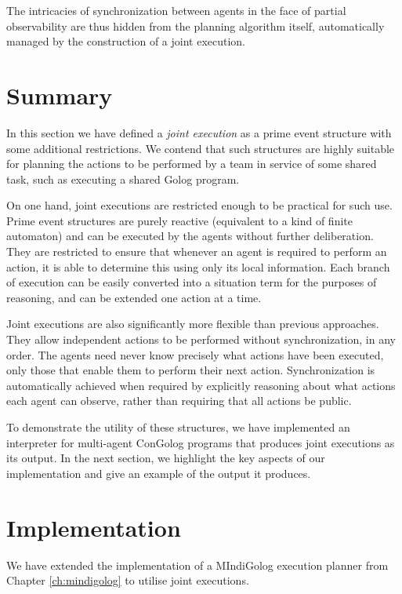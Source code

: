 The intricacies of synchronization between agents in the face of partial
observability are thus hidden from the planning algorithm itself,
automatically managed by the construction of a joint execution.


\section{Summary\label{sec:JointExec:Summary}}

In this section we have defined a \emph{joint execution} as a prime
event structure with some additional restrictions. We contend that
such structures are highly suitable for planning the actions to be
performed by a team in service of some shared task, such as executing
a shared Golog program.

On one hand, joint executions are restricted enough to be practical
for such use. Prime event structures are purely reactive (equivalent
to a kind of finite automaton) and can be executed by the agents without
further deliberation. They are restricted to ensure that whenever
an agent is required to perform an action, it is able to determine
this using only its local information. Each branch of execution can
be easily converted into a situation term for the purposes of reasoning,
and can be extended one action at a time.

Joint executions are also significantly more flexible than previous
approaches. They allow independent actions to be performed without
synchronization, in any order. The agents need never know precisely
what actions have been executed, only those that enable them to perform
their next action. Synchronization is automatically achieved when
required by explicitly reasoning about what actions each agent can
observe, rather than requiring that all actions be public.

To demonstrate the utility of these structures, we have implemented
an interpreter for multi-agent ConGolog programs that produces joint
executions as its output. In the next section, we highlight the key
aspects of our implementation and give an example of the output it
produces.


\section{Implementation\label{sec:JointExec:Implementation}}

We have extended the implementation of a MIndiGolog execution planner
from Chapter \ref{ch:mindigolog} to utilise joint executions.

